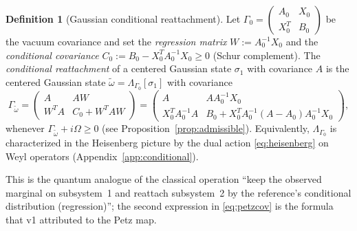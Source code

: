 \documentclass[11pt,a4paper]{article}
\theoremstyle{plain}
\theoremstyle{definition}
\newtheorem{definition}[theorem]{Definition}
\theoremstyle{remark}
\begin{document}
\begin{definition}[Gaussian conditional reattachment]\label{def:reattach}
Let $\Gamma_0 = \begin{pmatrix} A_0 & X_0 \\ X_0^T & B_0\end{pmatrix}$ be the
vacuum covariance and set the \emph{regression matrix} $W := A_0^{-1}X_0$ and the
\emph{conditional covariance} $C_0 := B_0 - X_0^T A_0^{-1} X_0 \ge 0$ (Schur
complement). The \emph{conditional reattachment} of a centered Gaussian state
$\sigma_1$ with covariance $A$ is the centered Gaussian state
$\tilde{\omega} = \Lambda_{\Gamma_0}[\sigma_1]$ with covariance
\begin{equation}\label{eq:petzcov}
\Gamma_{\tilde{\omega}} = \begin{pmatrix}
A & A W \\
W^T A & C_0 + W^T A W
\end{pmatrix}
= \begin{pmatrix}
A & A A_0^{-1} X_0 \\
X_0^T A_0^{-1} A & B_0 + X_0^T A_0^{-1}(A - A_0)A_0^{-1} X_0
\end{pmatrix},
\end{equation}
whenever $\Gamma_{\tilde{\omega}} + i\Omega \ge 0$ (see
Proposition~\ref{prop:admissible}). Equivalently, $\Lambda_{\Gamma_0}$ is
characterized in the Heisenberg picture by the dual action
\eqref{eq:heisenberg} on Weyl operators (Appendix~\ref{app:conditional}).
\end{definition}

This is the quantum analogue of the classical operation ``keep the observed
marginal on subsystem~1 and reattach subsystem~2 by the reference's conditional
distribution (regression)''; the second expression in \eqref{eq:petzcov} is the
formula that v1 attributed to the Petz map.
\end{document}
